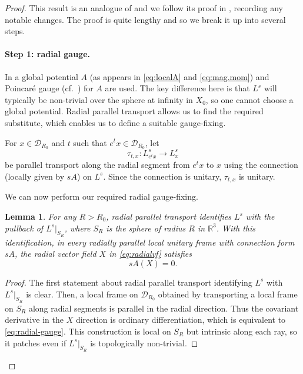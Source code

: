 \documentclass{article}
\newtheorem{lem}[thm]{Lemma}
\theoremstyle{definition}
\numberwithin{thm}{section}
\numberwithin{equation}{section}
\def\R{\mathbb{R}}
\begin{document}
\begin{proof}
   This result is an analogue of \cite[Theorem 4.8]{AHK} and we follow its proof in \cite[Sections 3 and 4]{AHK}, recording any notable changes.  The proof is quite lengthy and so we break it up into several steps.

\paragraph{\bf{Step 1: radial gauge.}}  
In \cite{AHK} a global potential $A$ (as appears in \eqref{eq:localA} and \eqref{eq:mag.mom}) and Poincaré gauge (cf.~\cite[Section 2.2]{AHK}) for $A$ are used. The key difference here is that $L^s$ will typically be non-trivial over the sphere at infinity in $X_0$, so one cannot choose a global potential.  Radial parallel transport allows us to find the required substitute, which enables us to define a suitable gauge-fixing.

For $x\in\mathcal{D}_{R_0}$ and $t$ such that $e^t x\in\mathcal{D}_{R_0}$, let
\begin{equation}\label{eq:tau.t.x}
        \tau_{t,x}:L^s_{e^t x}\longrightarrow L^s_x
\end{equation}
be parallel transport along the radial segment from $e^tx$ to $x$ using the connection (locally given by $sA$) on $L^s$.   Since the connection is unitary, $\tau_{t,x}$ is unitary.   

We can now perform our required radial gauge-fixing.

\begin{lem} 
\label{lem:radial-gauge}
For any $R>R_0$, radial parallel transport identifies $L^s$ with the pullback of $L^s|_{S_R}$, where $S_R$ is the sphere of radius $R$ in $\R^3$.  With this identification, in every radially parallel local unitary frame with connection form $sA$, the radial vector field $X$ in \eqref{eq:radialvf} satisfies  
\begin{equation}\label{eq:radial-gauge}
        sA(X)=0.
\end{equation}
\end{lem}

\begin{proof}
The first statement about radial parallel transport identifying $L^s$ with $L^s|_{S_R}$ is clear.  Then, a local frame on $\mathcal{D}_{R_0}$ obtained by transporting a local frame on $S_R$ along radial segments is parallel in the radial direction. Thus the covariant derivative in the $X$ direction is ordinary differentiation, which is equivalent to \eqref{eq:radial-gauge}.  This construction is local %
on $S_R$ but intrinsic along each ray, so it patches even if $L^s|_{S_R}$ is topologically non-trivial.
\end{proof}


\end{proof}
\end{document}
